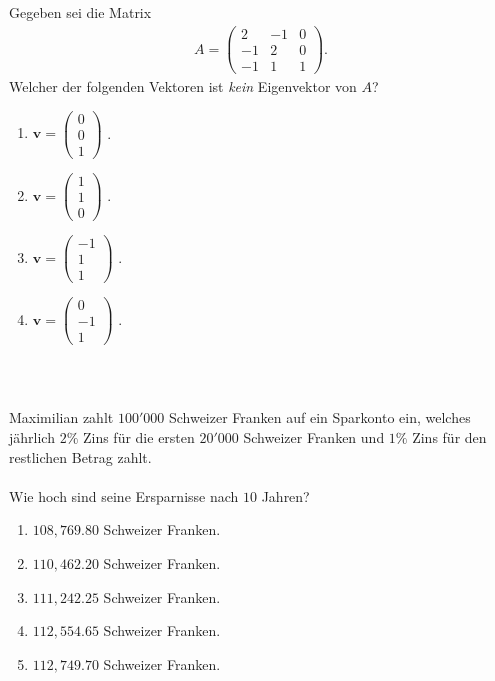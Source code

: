 \subsection*{}
Gegeben sei die Matrix
\begin{align*}
	A =
	\begin{pmatrix}
		2 & -1 & 0 \\
		-1 & 2 & 0 \\
		-1 & 1 & 1
	\end{pmatrix}
	.
\end{align*}
Welcher der folgenden Vektoren ist \textit{kein} Eigenvektor von $A$?
\renewcommand{\labelenumi}{(\alph{enumi})}
\begin{enumerate}
	\item 
	$ 
	\mathbf{v}
	=
	\begin{pmatrix}
		0\\ 0 \\ 1
	\end{pmatrix}
	$
	.
	\item 
		$ 
	\mathbf{v}
	=
	\begin{pmatrix}
		1\\ 1 \\ 0
	\end{pmatrix}
	$
	.
	\item
	$ 
	\mathbf{v}
	=
	\begin{pmatrix}
		-1\\ 1 \\ 1
	\end{pmatrix}
	$
	.
	\item
		$ 
	\mathbf{v}
	=
	\begin{pmatrix}
		0\\ -1 \\ 1
	\end{pmatrix}
	$
	.
\end{enumerate}
\ \\
\subsection*{}
Maximilian zahlt $100'000$ Schweizer Franken auf ein Sparkonto ein, welches jährlich $2 \%$ Zins für die ersten $20'000$ Schweizer Franken und $1 \%$ Zins für den restlichen Betrag zahlt.\\
\\
Wie hoch sind seine Ersparnisse nach $10 $ Jahren?
\renewcommand{\labelenumi}{(\alph{enumi})}
\begin{enumerate}
\item
$108,769.80$ Schweizer Franken.
\item
$110,462.20$ Schweizer Franken.	
\item 
$111,242.25$ Schweizer Franken.
\item
$112,554.65$ Schweizer Franken.
\item
$112,749.70$ Schweizer Franken.
\end{enumerate}
\newpage
